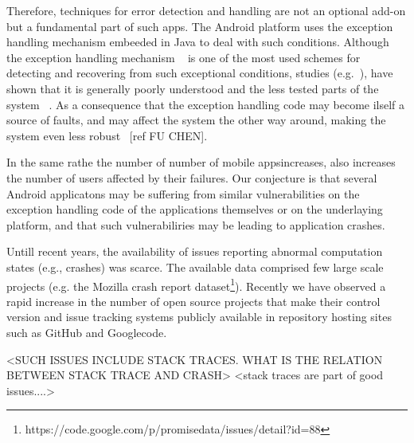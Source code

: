 \documentclass[conference]{IEEEtran}
\begin{document}
Therefore, techniques for error detection and handling are not  an optional add-on but a 
fundamental part of such apps.
The Android platform uses the exception handling mechanism embeeded
 in Java to deal with such conditions. Although the exception handling mechanism
~\cite{goodenough1975exception} is one of the most used schemes for
detecting and recovering from such exceptional conditions, studies (e.g.~\cite{miller1997issues,Robil00,shah2010understanding, garcia2007extracting,garcia2001comparative,cabral2007exception,coelho2011unveiling}),
have shown that it is generally poorly understood and the less tested parts of the system ~\cite{coelho2011unveiling}.
As a consequence that the exception handling code may become  ilself a source of faults, 
and may affect the system the other way around, making the system even less robust ~\cite{coelho2011unveiling}[ref FU CHEN].

In the same rathe the number of number of mobile appsincreases, also increases 
the number of users affected by their failures. Our conjecture is that several 
Android applicatons may be suffering from similar vulnerabilities on the exception 
handling code of the applications themselves or on the underlaying platform, and 
that such vulnerabiliries may be leading to application crashes.

Untill recent years, the availability of issues reporting abnormal
computation states (e.g., crashes) was scarce. The
available data comprised few large scale projects (e.g. the Mozilla
crash report dataset\footnote{https://code.google.com/p/promisedata/issues/detail?id=88}).
Recently we have observed a rapid increase in the number of open
source projects that make their control version and issue tracking systems
publicly available in repository hosting sites such as GitHub and Googlecode.



<SUCH ISSUES INCLUDE STACK TRACES. WHAT IS THE RELATION BETWEEN STACK TRACE AND CRASH>
<stack traces are part of good issues....>
\end{document}
